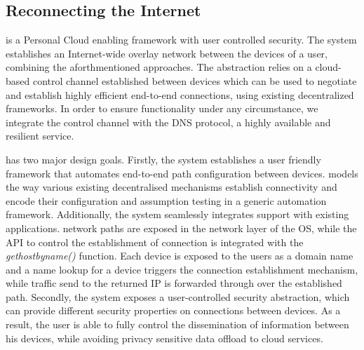 \subsection{Reconnecting the Internet}\label{sec:sp-signpost}

\signpost is a Personal Cloud enabling framework with user controlled security.
The system establishes an Internet-wide overlay network between the devices of a
user, combining the aforthmentioned approaches. The abstraction relies on a
cloud-based control channel established between devices which can be used to
negotiate and establish highly efficient end-to-end connections, using existing
decentralized frameworks. In order to ensure functionality
under any circumstance, we integrate the control channel with the DNS protocol, a highly
available and resilient service. 

\signpost has two major design goals.  Firstly, the system establishes a user
friendly framework that automates end-to-end path configuration between devices.
\signpost models the way various existing decentralised mechanisms establish
connectivity and encode their configuration and assumption testing in a generic
automation framework.  Additionally, the system seamlessly integrates support
with existing applications. \signpost network paths are exposed in the network
layer of the OS, while the API to control the establishment of connection is
integrated with the \textit{gethostbyname()} function.  Each device is exposed to the users as a
domain name and a name lookup for a device triggers the connection establishment
mechanism, while traffic send to the returned IP is forwarded through \of over
the established path.  Secondly, the system exposes a user-controlled security
abstraction, which can provide different security properties on connections
between devices. As a result, the user is able to fully control the
dissemination of information between his devices, while avoiding
privacy sensitive data offload to cloud services. 

